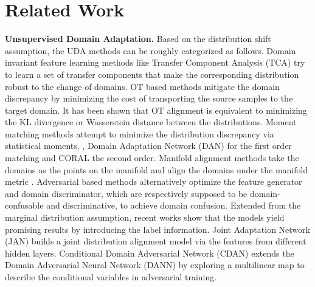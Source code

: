 \documentclass[final]{cvpr}
\begin{document}
\section{Related Work}
\textbf{Unsupervised Domain Adaptation.} Based on the distribution shift assumption, the UDA methods can be roughly categorized as follows. Domain invariant feature learning methods like Transfer Component Analysis (TCA) \cite{pan2010domain} try to learn a set of transfer components that make the corresponding distribution robust to the change of domains. OT based methods mitigate the domain discrepancy by minimizing the cost of transporting the source samples to the target domain. It has been shown that OT alignment is equivalent to minimizing the KL divergence \cite{courty2016optimal} or Wasserstein distance \cite{zhang2019optimal} between the distributions. Moment matching methods attempt to minimize the distribution discrepancy via statistical moments, \eg, Domain Adaptation Network (DAN) \cite{long2015learning} for the first order matching and CORAL \cite{sun2016return} the second order. Manifold alignment methods take the domains as the points on the manifold and align the domains under the manifold metric \cite{gong2012geodesic,luo2020unsupervised}. Adversarial based methods \cite{ganin2016domain,tang2020discriminative} alternatively optimize the feature generator and domain discriminator, which are respectively supposed to be domain-confusable and discriminative, to achieve domain confusion. Extended from the marginal distribution assumption, recent works \cite{bhushan2018deepjdot,courty2017joint,li2020Enhanced,long2018conditional,Long2017Deep} show that the models yield promising results by introducing the label information. Joint Adaptation Network (JAN) \cite{Long2017Deep} builds a joint distribution alignment model via the features from different hidden layers. Conditional Domain Adversarial Network (CDAN) \cite{long2018conditional} extends the Domain Adversarial Neural
Network (DANN) \cite{ganin2016domain} by exploring a multilinear map to describe the conditional variables in adversarial training.
\end{document}
